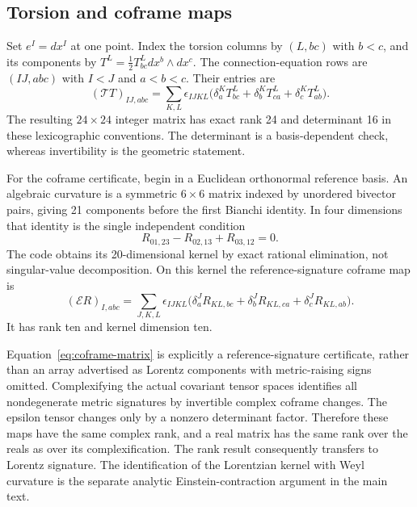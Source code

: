 \subsection{Torsion and coframe maps}

Set $e^I=dx^I$ at one point.
Index the torsion columns by $(L,bc)$ with $b<c$, and its components by
$T^L=\frac12 T^L_{bc}dx^b\wedge dx^c$.
The connection-equation rows are $(IJ,abc)$ with $I<J$ and $a<b<c$.
Their entries are
\begin{equation}
 (\mathcal T T)_{IJ,abc}
 =\sum_{K,L}\epsilon_{IJKL}
 \bigl(\delta^K_aT^L_{bc}
      +\delta^K_bT^L_{ca}
      +\delta^K_cT^L_{ab}\bigr).
 \label{eq:torsion-matrix}
\end{equation}
The resulting $24\times24$ integer matrix has exact rank 24 and determinant
16 in these lexicographic conventions.
The determinant is a basis-dependent check, whereas invertibility is the
geometric statement.

For the coframe certificate, begin in a Euclidean orthonormal reference
basis.
An algebraic curvature is a symmetric $6\times6$ matrix indexed by
unordered bivector pairs, giving 21 components before the first Bianchi
identity.
In four dimensions that identity is the single independent condition
\begin{equation}
 R_{01,23}-R_{02,13}+R_{03,12}=0.
\end{equation}
The code obtains its 20-dimensional kernel by exact rational elimination,
not singular-value decomposition.
On this kernel the reference-signature coframe map is
\begin{equation}
 (\mathcal E R)_{I,abc}
 =\sum_{J,K,L}\epsilon_{IJKL}
 \bigl(\delta^J_aR_{KL,bc}
      +\delta^J_bR_{KL,ca}
      +\delta^J_cR_{KL,ab}\bigr).
 \label{eq:coframe-matrix}
\end{equation}
It has rank ten and kernel dimension ten.

Equation~\eqref{eq:coframe-matrix} is explicitly a reference-signature
certificate, rather than an array advertised as Lorentz components with
metric-raising signs omitted.
Complexifying the actual covariant tensor spaces identifies all
nondegenerate metric signatures by invertible complex coframe changes.
The epsilon tensor changes only by a nonzero determinant factor.
Therefore these maps have the same complex rank, and a real matrix has the
same rank over the reals as over its complexification.
The rank result consequently transfers to Lorentz signature.
The identification of the Lorentzian kernel with Weyl curvature is the
separate analytic Einstein-contraction argument in the main text.

